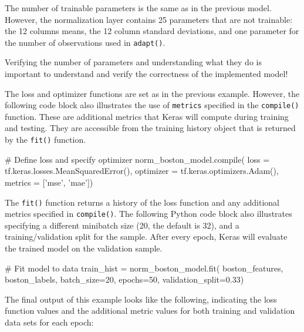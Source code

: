 The number of trainable parameters is the same as in the previous model. However, the normalization layer contains 25 parameters that are not trainable: the 12 columns means, the 12 column standard deviations, and one parameter for the number of observations used in \texttt{adapt()}. 

\begin{tcolorbox}[colback=alert]
Verifying the number of parameters and understanding what they do is important to understand and verify the correctness of the implemented model!
\end{tcolorbox}

The loss and optimizer functions are set as in the previous example. However, the following code block also illustrates the use of \texttt{metrics} specified in the \texttt{compile()} function. These are additional metrics that Keras will compute during training and testing. They are accessible from the training history object that is returned by the \texttt{fit()} function.

\begin{samepage}
\begin{pythoncode}
# Define loss and specify optimizer
norm_boston_model.compile(
    loss = tf.keras.losses.MeanSquaredError(),
    optimizer = tf.keras.optimizers.Adam(),
    metrics = ['mse', 'mae'])
\end{pythoncode}
\end{samepage}

\noindent The \texttt{fit()} function returns a history of the loss function and any additional metrics specified in \texttt{compile()}. The following Python code block also illustrates specifying a different minibatch size (20, the default is 32), and a training/validation split for the sample. After every epoch, Keras will evaluate the trained model on the validation sample. 

\begin{samepage}
\begin{pythoncode} 
# Fit model to data
train_hist = norm_boston_model.fit(
                    boston_features, 
                    boston_labels, 
                    batch_size=20,
                    epochs=50,
                    validation_split=0.33)
\end{pythoncode}
\end{samepage}

The final output of this example looks like the following, indicating the loss function values and the additional metric values for both training and validation data sets for each epoch:

